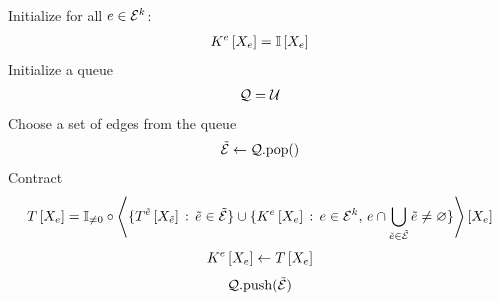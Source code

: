 \begin{algorithm}[hbt!]
\begin{algorithmic}
        \State Initialize for all $e\in\mathcal{E}^{k}$:
        \begin{align*}
            K^{e}\left[X_{e}\right]=\mathbb{I}\left[X_{e}\right]
        \end{align*}
        \State Initialize a queue
        \begin{align*}
            \mathcal{Q} = \mathcal{U}
        \end{align*}
            \State Choose a set of edges from the queue
            \begin{align*}
                \tilde{\mathcal{E}} \leftarrow \mathcal{Q}\mathrm{.pop()}
            \end{align*}
                \State Contract
                \begin{align*}
                    T\left[X_{e}\right]
                    = \mathbb{I}_{\neq0}\circ\left\langle 
                        \{T^{\tilde{e}}\left[X_{\tilde{e}}\right] \, : \, \tilde{e}\in\tilde{\mathcal{E}}\}
                        \cup \{K^{e}\left[X_{e}\right] \, : \, e \in \mathcal{E}^{k} , \, e\cap\bigcup_{\tilde{e}\in\tilde{\mathcal{E}}}\tilde{e}\neq\varnothing \}
                    \right\rangle \left[ X_{e} \right]
                \end{align*}
                \If{$\hypercoreat{\catvariableof{\edge}}\neq\kcoreofat{\edge}{\catvariableof{\edge}}$}
                    \begin{align*}
                        K^{e}\left[X_{e}\right] \leftarrow T\left[X_{e}\right]
                    \end{align*}
                        \begin{align*}
                            \mathcal{Q}\mathrm{.push(}\tilde{\mathcal{E}}\mathrm{)}
                        \end{align*}
                    \EndFor
                \EndIf
            \EndFor
        \EndWhile
    \end{algorithmic}
\end{algorithm}


